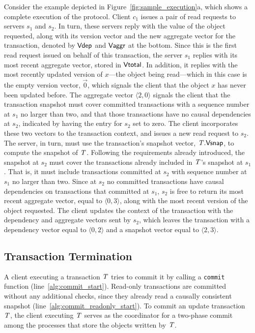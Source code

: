 Consider the example depicted in Figure~\ref{fig:sample_execution}a, which shows a complete execution of the protocol. Client $c_1$ issues a pair of read requests to servers $s_1$ and $s_2$. In turn, these servers reply with the value of the object requested, along with its version vector and the new aggregate vector for the transaction, denoted by $\mathsf{Vdep}$ and $\mathsf{Vaggr}$ at the bottom. Since this is the first read request issued on behalf of this transaction, the server $s_1$ replies with its most recent aggregate vector, stored in $\mathsf{Vtotal}$. In addition, it replies with the most recently updated version of $x$---the object being read---which in this case is the empty version vector, $\vec{0}$, which signals the client that the object $x$ has never been updated before. The aggregate vector $\langle 2, 0 \rangle$ signals the client that the transaction snapshot must cover committed transactions with a sequence number at $s_1$ no larger than two, and that those transactions have no causal dependencies at $s_2$, indicated by having the entry for $s_2$ set to zero. The client incorporates these two vectors to the transaction context, and issues a new read request to $s_2$. The server, in turn, must use the transaction's snapshot vector, $\mathit{T}.\mathsf{Vsnap}$, to compute the snapshot of $\mathit{T}$. Following the requirements already introduced, the snapshot at $s_2$ must cover the transactions already included in $\mathit{T}$'s snapshot at $s_1$. That is, it must include transactions committed at $s_2$ with sequence number at $s_1$ no larger than two. Since at $s_2$ no committed transactions have causal dependencies on transactions that committed at $s_1$, $s_2$ is free to return its most recent aggregate vector, equal to $\langle 0, 3 \rangle$, along with the most recent version of the object requested. The client updates the context of the transaction with the dependency and aggregate vectors sent by $s_2$, which leaves the transaction with a dependency vector equal to $\langle 0, 2 \rangle$ and a snapshot vector equal to $\langle 2, 3 \rangle$.

\subsection{Transaction Termination}

A client executing a transaction $\mathit{T}$ tries to commit it by calling a {\tt commit} function (line~\ref{alg:commit_start}). Read-only transactions are committed without any additional checks, since they already read a causally consistent snapshot (line~\ref{alg:commit_readonly_start}). To commit an update transaction $\mathit{T}$, the client executing $\mathit{T}$ serves as the coordinator for a two-phase commit among the processes that store the objects written by $\mathit{T}$.


